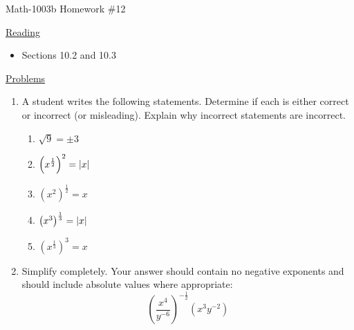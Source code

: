 \documentclass[letterpaper,12pt,fleqn]{article}
\begin{document}
\begin{center}
\Large Math-1003b Homework \#12
\end{center}

\vspace{0.5in}

\underline{Reading}

\bigskip

\begin{itemize}
\item Sections 10.2 and 10.3
\end{itemize}

\bigskip

\underline{Problems}

\bigskip

\begin{enumerate}
\item A student writes the following statements. Determine if each is either
correct or incorrect (or misleading). Explain why incorrect statements are
incorrect.
\begin{enumerate}
\item $\sqrt{9}=\pm3$
\item $\left(x^{\frac{1}{2}}\right)^2=\lvert x\rvert$
\item $\left(x^2\right)^{\frac{1}{2}}=x$
\item $\left(x^3\right)^{\frac{1}{3}}=\lvert x\rvert$
\item $\left(x^{\frac{1}{3}}\right)^3=x$
\end{enumerate}

\item Simplify completely. Your answer should contain no negative exponents and
  should include absolute values where appropriate:
  \[\left(\frac{x^4}{y^{-6}}\right)^{-\frac{1}{2}}\left(x^3y^{-2}\right)\]
\end{enumerate}
\end{document}
